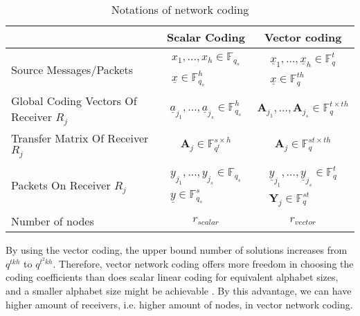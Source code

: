 \begin{table}[H]
\caption{Notations of network coding}

\label{tab:notations} 

\begin{tabular}{|>{\centering}p{0.2\paperwidth}|c|c|}
\hline 
 & Scalar Coding & Vector coding\tabularnewline
\hline 
\hline 
Source Messages/Packets & $\begin{array}{c}
x_{1},\ldots,x_{h}\in\ensuremath{\mathbb{F}}_{q_{s}}\\
\underline{x}\in\ensuremath{\mathbb{F}}_{q_{s}}^{h}
\end{array}$ & $\begin{array}{c}
\underline{x}_{1},\ldots,\underline{x}_{h}\in\ensuremath{\mathbb{F}}_{q}^{t}\\
\underline{x}\in\ensuremath{\mathbb{F}}_{q}^{th}
\end{array}$\tabularnewline
\hline 
Global Coding Vectors Of Receiver $R_{j}$ & $\underline{a}_{j_{1}},\ldots,\underline{a}_{j_{s}}\in\ensuremath{\mathbb{F}}_{q_{s}}^{h}$ & $\boldsymbol{A}_{j_{1}},\ldots,\boldsymbol{A}_{j_{s}}\in\ensuremath{\mathbb{F}}_{q}^{t\times th}$\tabularnewline
\hline 
Transfer Matrix Of Receiver $R_{j}$ & $\boldsymbol{A}_{j}\in\ensuremath{\mathbb{F}}_{q^{t}}^{s\times h}$ & $\boldsymbol{A}_{j}\in\ensuremath{\mathbb{F}}_{q}^{st\times th}$\tabularnewline
\hline 
Packets On Receiver $R_{j}$ & $\begin{array}{c}
y_{j_{1}},\ldots,y_{j_{s}}\in\ensuremath{\mathbb{F}}_{q_{s}}\\
\underline{y}\in\ensuremath{\mathbb{F}}_{q_{s}}^{s}
\end{array}$ & $\begin{array}{c}
\underline{y}_{j_{1}},\ldots,\underline{y}_{j_{s}}\in\ensuremath{\mathbb{F}}_{q}^{t}\\
\boldsymbol{Y}_{j}\in\ensuremath{\mathbb{F}}_{q}^{st}
\end{array}$\tabularnewline
\hline 
Number of nodes & $r_{scalar}$ & $r_{vector}$\tabularnewline
\hline 
\end{tabular}
\end{table}

\begin{rem}
By using the vector coding, the upper bound number of solutions increases
from $q^{tkh}$ to $q^{t^{2}kh}$. Therefore, vector network coding
offers more freedom in choosing the coding coefficients than does
scalar linear coding for equivalent alphabet sizes, and a smaller
alphabet size might be achievable \cite{Ebrahimi2011}. By this advantage,
we can have higher amount of receivers, i.e. higher amount of nodes,
in vector network coding.
\end{rem}


